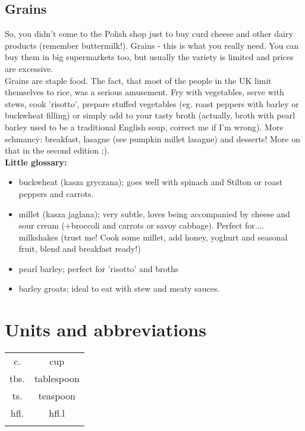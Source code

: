 \documentclass[%
titlepage,
b5paper,
twoside,
11pt
]{book}
\begin{document}
\subsection*{Grains}
So, you didn't come to the Polish shop just to buy curd cheese and other dairy products (remember buttermilk!). Grains - this is what you really need. You can buy them in big supermarkets too, but usually the variety is limited and prices are excessive.\\
Grains are staple food. The fact, that most of the people in the UK limit themselves to rice, was a serious amusement. Fry with vegetables, serve with stews, cook 'risotto', prepare stuffed vegetables (eg. roast peppers with barley or buckwheat filling) or simply add to your tasty broth (actually, broth with pearl barley used to be a traditional English soup, correct me if I'm wrong). More schmancy: breakfast, lasagne (see pumpkin millet lasagne) and desserts! More on that in the second edition ;).\\
\textbf{Little glossary:}

\begin{itemize}
    \setlength\itemsep{0.1mm}
    \item buckwheat (kasza gryczana); goes well with spinach and Stilton or roast peppers and carrots. 
    \item millet (kasza jaglana); very subtle, loves being accompanied by cheese and sour cream (+broccoli and carrots or savoy cabbage). Perfect for.... milkshakes (trust me! Cook some millet, add honey, yoghurt and seasonal fruit, blend and breakfast ready!) 
    \item pearl barley; perfect for 'risotto' and broths
    \item barley groats; ideal to eat with stew and meaty sauces. 
\end{itemize}

\section*{Units and abbreviations}
\begin{table}[h]
\centering
\begin{tabular}{cc}
    c.	& cup                     \\
    tbs. & tablespoon                     \\
    ts.	& teaspoon                    \\
    hfl. & hfl.l \\
    \multicolumn{1}{l}{} & \multicolumn{1}{l}{}
\end{tabular}
\end{table}
\newpage
\end{document}
